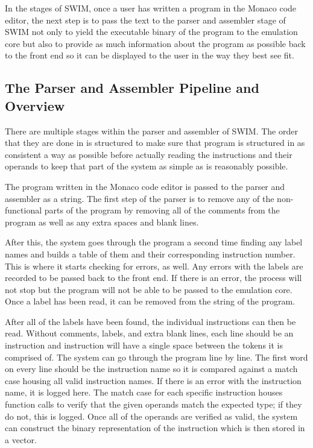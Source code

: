 \documentclass[
    parskip=half,
    fontsize=12pt,
    titlepage=firstiscover,
    toc=bibliography,
    numbers=endperiod
]{scrartcl}
\begin{document}
In the stages of SWIM, once a user has written a program in the Monaco
code editor, the next step is to pass the text to the parser and
assembler stage of SWIM not only to yield the executable binary of the
program to the emulation core but also to provide as much information
about the program as possible back to the front end so it can be
displayed to the user in the way they best see fit.

\subsection{The Parser and Assembler Pipeline and Overview}

There are multiple stages within the parser and assembler of SWIM. The
order that they are done in is structured to make sure that program is
structured in as consistent a way as possible before actually reading
the instructions and their operands to keep that part of the system as
simple as is reasonably possible.

The program written in the Monaco code editor is passed to the parser
and assembler as a string. The first step of the parser is to remove any
of the non-functional parts of the program by removing all of the
comments from the program as well as any extra spaces and blank lines.

After this, the system goes through the program a second time finding
any label names and builds a table of them and their corresponding
instruction number. This is where it starts checking for errors, as
well. Any errors with the labels are recorded to be passed back to the
front end. If there is an error, the process will not stop but the
program will not be able to be passed to the emulation core. Once a
label has been read, it can be removed from the string of the program.

After all of the labels have been found, the individual instructions can
then be read. Without comments, labels, and extra blank lines, each line
should be an instruction and instruction will have a single space
between the tokens it is comprised of. The system can go through the
program line by line. The first word on every line should be the
instruction name so it is compared against a match case housing all
valid instruction names. If there is an error with the instruction name,
it is logged here. The match case for each specific instruction houses
function calls to verify that the given operands match the expected
type; if they do not, this is logged. Once all of the operands are
verified as valid, the system can construct the binary representation of
the instruction which is then stored in a vector.
\end{document}
